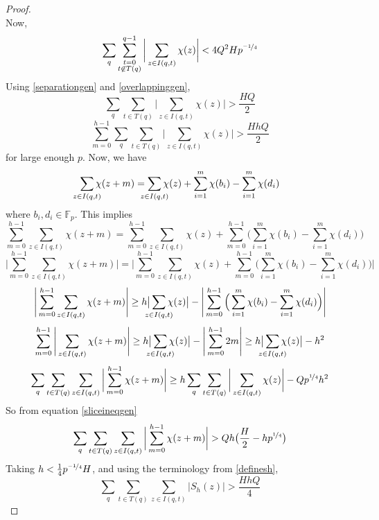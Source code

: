 \documentclass{report}
\begin{document}
\begin{proof}
\begin{equation}
\end{equation}
Now,
\begin{equation} \label{overlappinggen}
\sum_q\sum\limits_{\substack{t=0\\t\not \in T(q)}}^{q-1}\bigg\lvert\sum\limits_{z\in I(q,t) }\chi(z)\bigg \rvert < 4Q^2 Hp^{\nicefrac{-1}{4}}
\end{equation}
Using \ref{separationgen} and \ref{overlappinggen},
$$\sum_q\sum\limits_{t\in T(q)}\bigg \lvert\sum\limits_{z\in I(q,t)}\chi(z)\bigg \rvert >\frac{HQ}{2}$$
\begin{equation}
\sum\limits_{m=0}^{h-1}\sum_q\sum\limits_{t\in T(q)}\bigg \lvert\sum\limits_{z\in I(q,t)}\chi(z)\bigg \rvert > \frac{HhQ}{2}
\end{equation} \label{sliceineqgen}
for large enough $p$. Now, we have
$$\sum\limits_{\mathclap {z\in I(q,t)}}\chi(z+m)= \sum\limits_{\mathclap{z\in I(q,t)}}\chi(z) + \sum\limits_{i=1}^m\chi(b_i)-\sum\limits_{i=1}^m\chi(d_i)$$
where $b_i,d_i\in\mathbb{F}_p$. This implies
$$\sum\limits_{m=0}^{h-1}\sum\limits_{z\in I(q,t)}\chi(z+m)= \sum\limits_{m=0}^{h-1}\sum\limits_{z\in I(q,t)}\chi(z) + \sum\limits_{m=0}^{h-1}\Big(\sum\limits_{i=1}^m\chi(b_i)-\sum\limits_{i=1}^m\chi(d_i)\Big)$$
$$\Bigg\lvert\sum\limits_{m=0}^{h-1}\sum\limits_{z\in I(q,t)}\chi(z+m)\Bigg\rvert= \Bigg\lvert\sum\limits_{m=0}^{h-1} \sum\limits_{z\in I(q,t)}\chi(z) + \sum\limits_{m=0}^{h-1}\Big(\sum\limits_{i=1}^m\chi(b_i)-\sum\limits_{i=1}^m \chi(d_i)\Big)\Bigg\rvert$$
$$\Bigg\lvert\sum\limits_{m=0}^{h-1}\sum\limits_{z\in I(q,t)}\chi(z+m)\Bigg\rvert \geq h\big\lvert\sum\limits_{\mathclap{ z\in I(q,t)}}\chi(z)\big\rvert -\Bigg\lvert\sum\limits_{m=0}^{h-1}\Big(\sum\limits_{i=1}^m\chi(b_i)-\sum\limits_{i=1}^m \chi(d_i)\Big)\Bigg\rvert$$
$$\sum\limits_{m=0}^{h-1}\Bigg\lvert\sum\limits_{z\in I(q,t)}\chi(z+m)\Bigg\rvert \geq h\big\lvert\sum\limits_{\mathclap{ z\in I(q,t)}}\chi(z)\big\rvert -\Bigg\lvert\sum\limits_{m=0}^{h-1}2m\Bigg\rvert \geq h\big\lvert\sum\limits_{\mathclap{z\in I(q,t)}}\chi(z)\big\rvert -h^2$$
$$\sum_q\sum\limits_{t\in T(q)}\sum\limits_{z\in I(q,t)}\bigg \lvert \sum\limits_{m=0}^{h-1}\chi(z+m) \bigg \rvert \geq h\sum_q\sum\limits_{t\in T(q)}\bigg \lvert \sum\limits_{z\in I(q,t)}\chi(z)\bigg \rvert-Qp^{\nicefrac{1}{4}}h^2$$
So from equation \ref{sliceineqgen}
$$\sum_q\sum\limits_{t\in T(q)}\sum\limits_{z\in I(q,t)}\bigg \lvert \sum\limits_{m=0}^{h-1}\chi(z+m) \bigg \rvert > Qh\big(\frac{H}{2}-hp^{\nicefrac{1}{4}}\big)$$
Taking $h<\frac{1}{4}p^{\nicefrac{-1}{4}}H$, and using the terminology from \ref{definesh},
$$\sum_q\sum\limits_{t\in T(q)}\sum\limits_{z\in I(q,t)}\lvert S_h(z) \rvert > \frac{HhQ}{4}$$

\end{proof}
\end{document}
